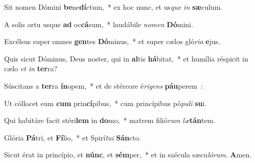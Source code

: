 ﻿\item Sit nomen Dómini \textbf{be}\-ne\textbf{dí}\-ctum,~* ex hoc nunc, et us\-\emph{que} \emph{in} \textbf{sæ}\-culum.
\item A solis ortu usque \textbf{ad} oc\textbf{cá}\-sum,~* laudábile \emph{no}\-\emph{men} \textbf{Dó}\-mi\-ni.
\item Excélsus super omnes \textbf{gen}\-tes \textbf{Dó}\-minus,~* et super cælos gló\-\emph{ri}\-\emph{a} \textbf{e}\-jus.
\item Quis sicut Dóminus, Deus noster, qui in \textbf{al}\-tis \textbf{há}\-bitat,~* et humília réspicit in cælo \emph{et} \emph{in} \textbf{ter}\-ra?
\item Súscitans a \textbf{ter}\-ra \textbf{ín}\-opem,~* et de stércore é\emph{ri}\-\emph{gens} \textbf{páu}\-pe\-rem~:
\item Ut cóllocet eum \textbf{cum} prin\textbf{cí}\-pibus,~* cum princípibus pó\-\emph{pu}\-\emph{li} \textbf{su}\-i.
\item Qui habitáre facit stéri\textbf{lem} in \textbf{do}\-mo,~* matrem fi\-li\-ó\-\emph{rum} \emph{læ}\-\textbf{tán}\-tem.
\item Glória \textbf{Pá}\-tri, et \textbf{Fí}\-lio,~* et Spirí\emph{tu}\-\emph{i} \textbf{Sán}\-cto.
\item Sicut érat in princípio, et \textbf{núnc}, et \textbf{sém}\-per,~* et in saécula sæcu\emph{ló}\-\emph{rum}. \textbf{A}\-men.